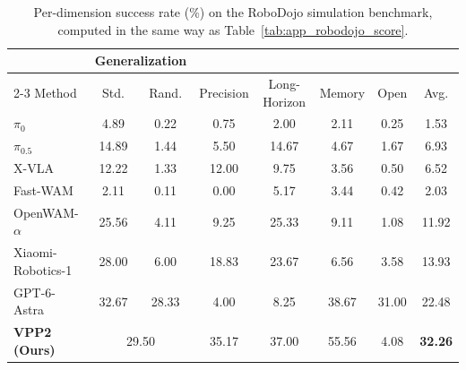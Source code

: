 \begin{table}[t]
\centering
\small
\setlength{\tabcolsep}{3.5pt}
\begin{tabular}{lccccccc}
\toprule
 & \multicolumn{2}{c}{Generalization} & & & & & \\
\cmidrule(lr){2-3}
Method & Std. & Rand. & Precision & Long-Horizon & Memory & Open & Avg. \\
\midrule
$\pi_0$~\citep{black2024pi_0} & 4.89 & 0.22 & 0.75 & 2.00 & 2.11 & 0.25 & 1.53 \\
$\pi_{0.5}$~\citep{intelligence2025pi_} & 14.89 & 1.44 & 5.50 & 14.67 & 4.67 & 1.67 & 6.93 \\
X-VLA~\citep{zheng2026xvla} & 12.22 & 1.33 & 12.00 & 9.75 & 3.56 & 0.50 & 6.52 \\
Fast-WAM~\citep{yuan2026fastwam} & 2.11 & 0.11 & 0.00 & 5.17 & 3.44 & 0.42 & 2.03 \\
OpenWAM-$\alpha$~\citep{wang2026openwam} & 25.56 & 4.11 & 9.25 & 25.33 & 9.11 & 1.08 & 11.92 \\
Xiaomi-Robotics-1~\citep{guo2026xiaomirobotics1} & 28.00 & 6.00 & 18.83 & 23.67 & 6.56 & 3.58 & 13.93 \\
GPT-6-Astra~\citep{zhang2026astra} & 32.67 & 28.33 & 4.00 & 8.25 & 38.67 & 31.00 & 22.48 \\
\midrule
\textbf{VPP2 (Ours)} & \multicolumn{2}{c}{29.50} & 35.17 & 37.00 & 55.56 & 4.08 & \textbf{32.26} \\
\bottomrule
\end{tabular}
\caption{Per-dimension success rate (\%) on the RoboDojo simulation benchmark, computed in the same way as Table~\ref{tab:app_robodojo_score}.}
\label{tab:app_robodojo_sr}
\end{table}
